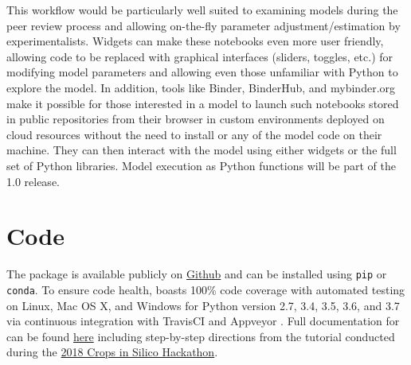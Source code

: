 \documentclass[journal]{IEEEtran}
\newcommand{\todo}[1]{{\color{red}{#1}}}
\newcommand{\pkg}{{\tt \todo{cis\_interface}}{}}
\begin{document}
This workflow would be particularly well suited to examining models during the peer review process and allowing on-the-fly parameter adjustment/estimation by experimentalists. Widgets can make these notebooks even more user friendly, allowing code to be replaced with graphical interfaces (sliders, toggles, etc.) for modifying model parameters and allowing even those unfamiliar with Python to explore the model. In addition, tools like Binder, BinderHub, and mybinder.org \citep{Jupyter2018} make it possible for those interested in a model to launch such notebooks stored in public repositories from their browser in custom environments deployed on cloud resources without the need to install {\pkg} or any of the model code on their machine. They can then interact with the model using either widgets or the full set of Python libraries.
%
Model execution as Python functions will be part of the {\pkg} 1.0 release.

\section*{Code}\label{S:code}
The {\pkg} package is available publicly on \href{https://github.com/cropsinsilico/cis_interface}{Github} and can be 
installed using {\tt pip} or {\tt conda}. To ensure code health, {\pkg} boasts 100\% code coverage with automated testing on Linux, Mac OS X, and Windows for Python version 2.7, 3.4, 3.5, 3.6, and 3.7 via continuous integration with TravisCI \citep{travisci} and Appveyor \citep{appveyor}. Full documentation for {\pkg} can be found \href{https://cropsinsilico.github.io/cis_interface/}{here} including step-by-step directions from the tutorial conducted during the \href{https://cropsinsilico.github.io/cis_interface/hackathon2018/index.html}{2018 Crops in Silico Hackathon}.

\todo{comment about 1.0 release}

\end{document}
